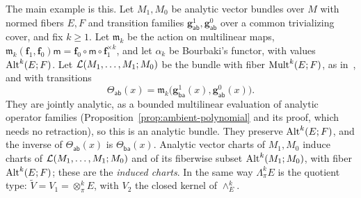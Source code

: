 The main example is this. Let $M_1,M_0$ be analytic vector bundles over $M$ with normed fibers $E,F$ and transition families $\mathbf g^1_{\mathsf{ab}},\mathbf g^0_{\mathsf{ab}}$ over a common trivializing cover, and fix $k\ge1$. Let $\mathfrak m_k$ be the action on multilinear maps, $\mathfrak m_k(\mathbf f_1,\mathbf f_0)\mathsf m=\mathbf f_0\circ\mathsf m\circ \mathbf f_1^{\times k}$, and let $\alpha_k$ be Bourbaki's functor, with values $\operatorname{Alt}^k(E;F)$. Let $\mathcal L(M_1,\dots,M_1;M_0)$ be the bundle with fiber $\operatorname{Mult}^k(E;F)$, as in~\cite[n\textsuperscript{o}~7.8.1]{Bou}, and with transitions
\[
 \Theta_{\mathsf{ab}}(x)=\mathfrak m_k\bigl(\mathbf g^1_{\mathsf{ba}}(x),\mathbf g^0_{\mathsf{ab}}(x)\bigr).
\]
They are jointly analytic, as a bounded multilinear evaluation of analytic operator families (Proposition~\ref{prop:ambient-polynomial} and its proof, which needs no retraction), so this is an analytic bundle. They preserve $\operatorname{Alt}^k(E;F)$, and the inverse of $\Theta_{\mathsf{ab}}(x)$ is $\Theta_{\mathsf{ba}}(x)$. Analytic vector charts of $M_1,M_0$ induce charts of $\mathcal L(M_1,\dots,M_1;M_0)$ and of its fiberwise subset $\operatorname{Alt}^k(M_1;M_0)$, with fiber $\operatorname{Alt}^k(E;F)$; these are the \emph{induced charts}. In the same way $\Lambda^k_\pi E$ is the quotient type: $\tilde V=V_1=\otimes^k_\pi E$, with $V_2$ the closed kernel of $\wedge^k_E$.

